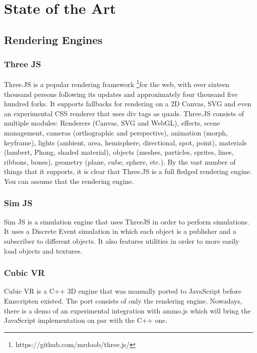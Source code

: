 \chapter{State of the Art}
\label{chapter:Chapter 2}


\section{Rendering Engines}
\subsection {Three JS}

Three.JS is a popular rendering framework \footnote{https://github.com/mrdoob/three.js/}for the web, with over sixteen thousand persons following its updates and approximately four thousand five hundred forks. It supports fallbacks for rendering on a 2D Canvas, SVG and even an experimental CSS renderer that uses div tags as quads.
Three.JS consists of multiple modules: Renderers (Canvas, SVG and WebGL), effects, scene management, cameras (orthographic and perspective), animation (morph, keyframe), lights (ambient, area, hemisphere, directional, spot, point), materials (lambert, Phong, shaded material), objects (meshes, particles, sprites, lines, ribbons, bones), geometry (plane, cube, sphere, etc.).
By the vast number of things that it supports, it is clear that Three.JS is a full fledged rendering engine. You can assume that the rendering engine.



\subsection{Sim JS}
 
Sim JS is a simulation engine that uses ThreeJS in order to perform simulations. It uses a Discrete Event simulation in which each object is a publisher and a subscriber to different objects. It also features utilities in order to more easily load objects and textures.

\subsection{Cubic VR}

Cubic VR is a C++ 3D engine that was manually ported to JavaScript before Emscripten existed. The port consists of only the rendering engine. Nowadays, there is a demo of an experimental integration with ammo.js which will bring the JavaScript implementation on par with the C++ one.

